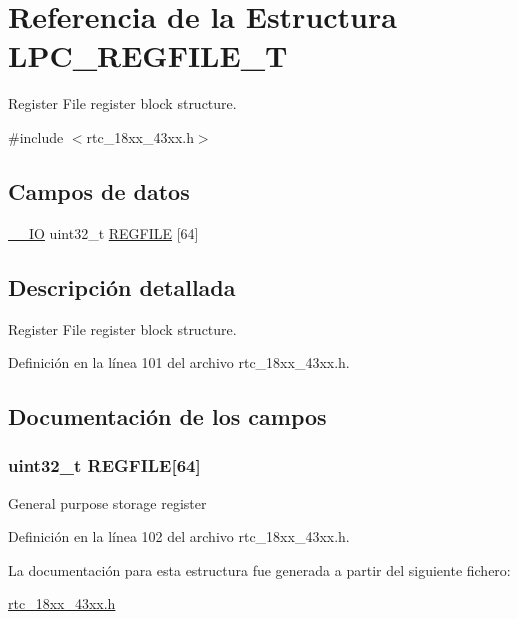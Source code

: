 \hypertarget{struct_l_p_c___r_e_g_f_i_l_e___t}{}\section{Referencia de la Estructura L\+P\+C\+\_\+\+R\+E\+G\+F\+I\+L\+E\+\_\+T}
\label{struct_l_p_c___r_e_g_f_i_l_e___t}


Register File register block structure.  




{\ttfamily \#include $<$rtc\+\_\+18xx\+\_\+43xx.\+h$>$}

\subsection*{Campos de datos}
\begin{DoxyCompactItemize}
\item 
\hyperlink{core__sc300_8h_aec43007d9998a0a0e01faede4133d6be}{\+\_\+\+\_\+\+IO} uint32\+\_\+t \hyperlink{struct_l_p_c___r_e_g_f_i_l_e___t_ab0d76608c3c80e4992c3a87cff005c88}{R\+E\+G\+F\+I\+LE} \mbox{[}64\mbox{]}
\end{DoxyCompactItemize}


\subsection{Descripción detallada}
Register File register block structure. 

Definición en la línea 101 del archivo rtc\+\_\+18xx\+\_\+43xx.\+h.



\subsection{Documentación de los campos}
\subsubsection[{\texorpdfstring{R\+E\+G\+F\+I\+LE}{REGFILE}}]{ uint32\+\_\+t R\+E\+G\+F\+I\+LE\mbox{[}64\mbox{]}}\hypertarget{struct_l_p_c___r_e_g_f_i_l_e___t_ab0d76608c3c80e4992c3a87cff005c88}{}\label{struct_l_p_c___r_e_g_f_i_l_e___t_ab0d76608c3c80e4992c3a87cff005c88}
General purpose storage register 

Definición en la línea 102 del archivo rtc\+\_\+18xx\+\_\+43xx.\+h.



La documentación para esta estructura fue generada a partir del siguiente fichero\+:\begin{DoxyCompactItemize}
\item 
\hyperlink{rtc__18xx__43xx_8h}{rtc\+\_\+18xx\+\_\+43xx.\+h}\end{DoxyCompactItemize}
